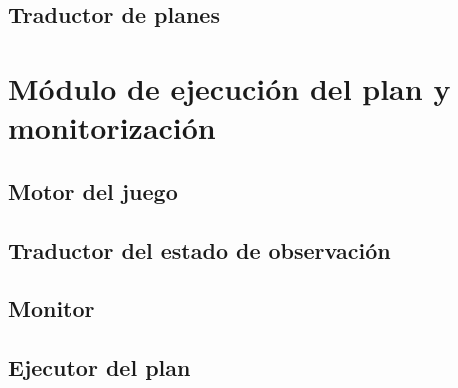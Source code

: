 \subsection{Traductor de planes}

\section{Módulo de ejecución del plan y monitorización}

\subsection{Motor del juego}

\subsection{Traductor del estado de observación}

\subsection{Monitor}

\subsection{Ejecutor del plan}

